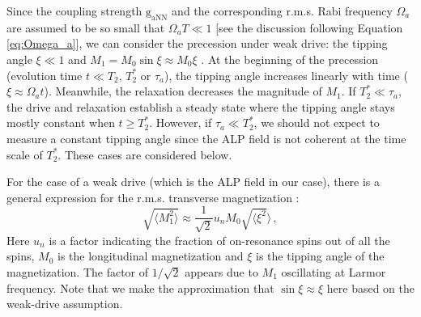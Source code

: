 Since the coupling strength $\mathrm{g_{aNN}}$ and the corresponding r.m.s. Rabi frequency $\Omega_a$ are assumed to be so small that $\Omega_a T \ll 1$ $[$see the discussion following Equation\,\eqref{eq:Omega_a}$]$, we can consider the precession under weak drive: the tipping angle $\xi \ll 1$ and $M_{1} = M_{0}\sin\xi \approx  M_{0}\xi$ \cite{Abragam1961ThePO}. At the beginning of the precession (evolution time $t \ll T_2,\, T_2^*$ or $\tau_a$), the tipping angle increases linearly with time ($\xi \approx \Omega_a t$). 
Meanwhile, the relaxation decreases the magnitude of $M_{1}$. 
If $T_2^* \ll \tau_a$, the drive and relaxation establish a steady state where the tipping angle stays mostly constant when $t\geq T_2^*$. 
However, if $\tau_a \ll T_2^*$, 
we should not expect to measure a constant tipping angle since the ALP field is not coherent at the time scale of $T_2^*$. 
These cases are considered below. 

For the case of a weak drive (which is the ALP field in our case), there is a general expression for the r.m.s. transverse magnetization \cite{Abragam1961ThePO}:
\begin{equation}
    \sqrt{\langle M_{1}^2 \rangle} \approx \dfrac{1}{\sqrt{2}} u_n M_{0} \sqrt{\langle  \xi^2 }\rangle 
    \,,\label{eq:M1_u_M0_Omega}
\end{equation}
Here $u_n$ is a factor indicating the fraction of on-resonance spins out of all the spins, $M_{0}$ is the longitudinal magnetization and $\xi$ is the tipping angle of the magnetization.
The factor of $1/\sqrt{2}$ appears due to $M_1$ oscillating at Larmor frequency. 
Note that we make the approximation that $\sin\xi \approx \xi$ here based on the weak-drive assumption. 

